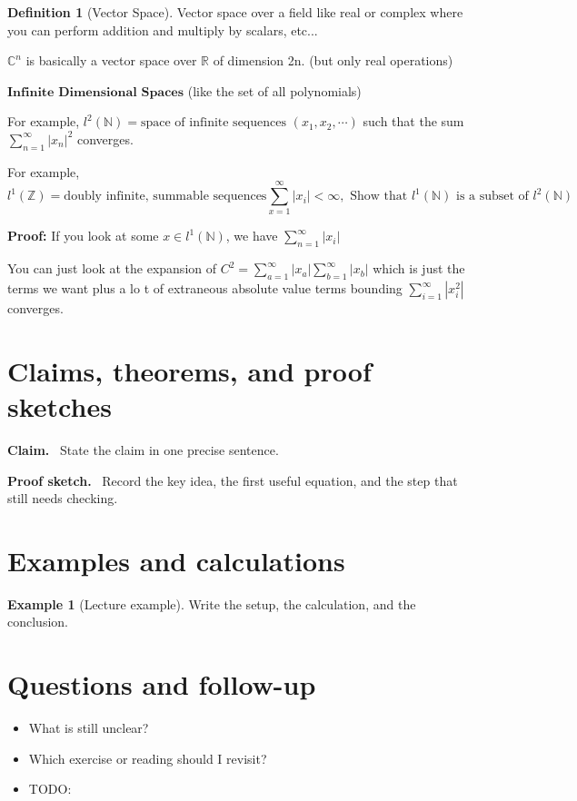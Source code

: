 \documentclass[11pt]{article}
\newcommand{\1}{\mathbf{1}}
\theoremstyle{notestyle}
\theoremstyle{definition}
\newtheorem{definition}[theorem]{Definition}
\newtheorem{example}[theorem]{Example}
\newenvironment{claim}{\par\noindent\textbf{Claim.}\ }{\par}
\newenvironment{proofsketch}{\par\noindent\textbf{Proof sketch.}\ }{\par}
\begin{document}
\begin{definition}[Vector Space]
\label{def:label}
Vector space over a field like real or complex where you can perform addition and
multiply by scalars, etc...
\par $\mathbb{C}^{n}$ is basically a vector space over $\mathbb{R}$ of dimension 2n. (but
only real operations)
\par $\textbf{Infinite Dimensional Spaces}$ (like the set of all polynomials)
\par For example, $l^2(\mathbb{N}) = \text{space of infinite sequences } (x_1, x_2, \cdots)$
such that the sum $\sum_{n=1}^{\infty}|x_n|^2$ converges.
\par For example, $$l^1(\mathbb{Z}) = \text{doubly infinite, summable sequences}
\sum_{x=1}^{\infty} |x_i| < \infty, \text{ Show that } l^1(\mathbb{N}) \text{ is a
subset of } l^2(\mathbb{N})$$
\par \textbf{Proof: }
If you look at some $x \in l^1(\mathbb{N})$, we have $\sum_{n=1}^{\infty} |x_i| $
\par You can just look at the expansion of $C^2 =
\sum_{a=1}^{\infty}|x_a|\sum_{b=1}^{\infty}|x_b|$ which is just the terms we want plus a lo t
of extraneous absolute value terms bounding $\sum_{i=1}^{\infty}|x_i^2|$
converges.
\end{definition}

\section{Claims, theorems, and proof sketches}
\begin{claim}
State the claim in one precise sentence.
\end{claim}

\begin{proofsketch}
Record the key idea, the first useful equation, and the step that still needs checking.
\end{proofsketch}

\section{Examples and calculations}
\begin{example}[Lecture example]
Write the setup, the calculation, and the conclusion.
\end{example}

\section{Questions and follow-up}
\begin{itemize}
  \item What is still unclear?
  \item Which exercise or reading should I revisit?
  \item TODO: 
\end{itemize}
\end{document}
